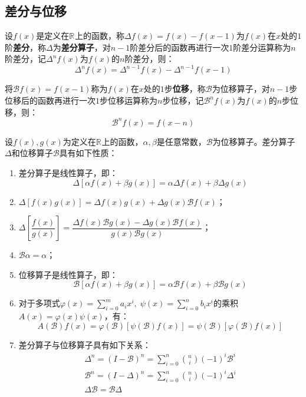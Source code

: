 \subsection{差分与位移}
\begin{definition}
	设$f(x)$是定义在$\mathbb{R}^{}$上的函数，称$\Delta f(x)=f(x)-f(x-1)$为$f(x)$在$x$处的$1$阶\textbf{差分}，称$\Delta$为\textbf{差分算子}，对$n-1$阶差分后的函数再进行一次$1$阶差分运算称为$n$阶差分，记$\Delta^nf(x)$为$f(x)$的$n$阶差分，则：
	\begin{equation*}
		\Delta^nf(x)=\Delta^{n-1}f(x)-\Delta^{n-1}f(x-1)
	\end{equation*}\par
	将$\mathcal{B}f(x)=f(x-1)$称为$f(x)$在$x$处的$1$步\textbf{位移}，称$\mathcal{B}$为位移算子，对$n-1$步位移后的函数再进行一次$1$步位移运算称为$n$步位移，记$\mathcal{B}^nf(x)$为$f(x)$的$n$步位移，则：
	\begin{equation*}
		\mathcal{B}^nf(x)=f(x-n)
	\end{equation*}
\end{definition}
\begin{property}
	设$f(x),g(x)$为定义在$\mathbb{R}^{}$上的函数，$\alpha,\beta$是任意常数，$\mathcal{B}$为位移算子。差分算子$\Delta$和位移算子$\mathcal{B}$具有如下性质：
	\begin{enumerate}
		\item 差分算子是线性算子，即：
		\begin{equation*}
			\Delta[\alpha f(x)+\beta g(x)]=\alpha\Delta f(x)+\beta\Delta g(x)
		\end{equation*}
		\item $\Delta[f(x)g(x)]=\Delta f(x)g(x)+\Delta g(x)\mathcal{B}f(x)$；
		\item $\Delta\left[\dfrac{f(x)}{g(x)}\right]=\dfrac{\Delta f(x)\mathcal{B}g(x)-\Delta g(x)\mathcal{B}f(x)}{g(x)\mathcal{B}g(x)}$；
		\item $\mathcal{B}\alpha=\alpha$；
		\item 位移算子是线性算子，即：
		\begin{equation*}
			\mathcal{B}[\alpha f(x)+\beta g(x)]=\alpha\mathcal{B}f(x)+\beta\mathcal{B}g(x)
		\end{equation*}
		\item 对于多项式$\varphi(x)=\sum\limits_{i=0}^{m}a_ix^i,\;\psi(x)=\sum\limits_{i=0}^{n}b_ix^i$的乘积$A(x)=\varphi(x)\psi(x)$，有：
		\begin{equation*}
			A(\mathcal{B})f(x)=\varphi(\mathcal{B})[\psi(\mathcal{B})f(x)]=\psi(\mathcal{B})[\varphi(\mathcal{B})f(x)]
		\end{equation*}
		\item 差分算子与位移算子具有如下关系：
		\begin{gather*}
			\Delta^n=(I-\mathcal{B})^n=\sum_{i=0}^{n}\binom{n}{i}(-1)^i\mathcal{B}^i \\
			\mathcal{B}^n=(I-\Delta)^n=\sum_{i=0}^{n}\binom{n}{i}(-1)^i\Delta^i \\
			\Delta\mathcal{B}=\mathcal{B}\Delta
		\end{gather*}
	\end{enumerate}
\end{property}

